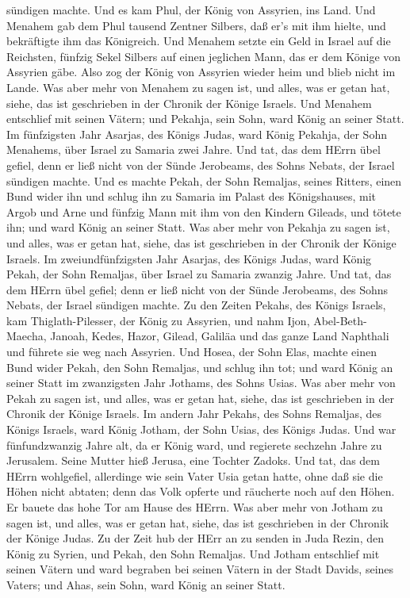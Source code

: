 sündigen machte.  Und es kam Phul, der König von Assyrien,
ins Land. Und Menahem gab dem Phul tausend Zentner Silbers, daß er's mit
ihm hielte, und bekräftigte ihm das Königreich.  Und
Menahem setzte ein Geld in Israel auf die Reichsten, fünfzig Sekel
Silbers auf einen jeglichen Mann, das er dem Könige von Assyrien gäbe.
Also zog der König von Assyrien wieder heim und blieb nicht im Lande.
 Was aber mehr von Menahem zu sagen ist, und alles, was er
getan hat, siehe, das ist geschrieben in der Chronik der Könige Israels.
 Und Menahem entschlief mit seinen Vätern; und Pekahja,
sein Sohn, ward König an seiner Statt.  Im fünfzigsten Jahr
Asarjas, des Königs Judas, ward König Pekahja, der Sohn Menahems, über
Israel zu Samaria zwei Jahre.  Und tat, das dem HErrn übel
gefiel, denn er ließ nicht von der Sünde Jerobeams, des Sohns Nebats,
der Israel sündigen machte.  Und es machte Pekah, der Sohn
Remaljas, seines Ritters, einen Bund wider ihn und schlug ihn zu Samaria
im Palast des Königshauses, mit Argob und Arne und fünfzig Mann mit ihm
von den Kindern Gileads, und tötete ihn; und ward König an seiner Statt.
 Was aber mehr von Pekahja zu sagen ist, und alles, was er
getan hat, siehe, das ist geschrieben in der Chronik der Könige Israels.
 Im zweiundfünfzigsten Jahr Asarjas, des Königs Judas, ward
König Pekah, der Sohn Remaljas, über Israel zu Samaria zwanzig Jahre.
 Und tat, das dem HErrn übel gefiel; denn er ließ nicht von
der Sünde Jerobeams, des Sohns Nebats, der Israel sündigen machte.
 Zu den Zeiten Pekahs, des Königs Israels, kam
Thiglath-Pilesser, der König zu Assyrien, und nahm Ijon,
Abel-Beth-Maecha, Janoah, Kedes, Hazor, Gilead, Galiläa und das ganze
Land Naphthali und führete sie weg nach Assyrien.  Und
Hosea, der Sohn Elas, machte einen Bund wider Pekah, den Sohn Remaljas,
und schlug ihn tot; und ward König an seiner Statt im zwanzigsten Jahr
Jothams, des Sohns Usias.  Was aber mehr von Pekah zu sagen
ist, und alles, was er getan hat, siehe, das ist geschrieben in der
Chronik der Könige Israels.  Im andern Jahr Pekahs, des
Sohns Remaljas, des Königs Israels, ward König Jotham, der Sohn Usias,
des Königs Judas.  Und war fünfundzwanzig Jahre alt, da er
König ward, und regierete sechzehn Jahre zu Jerusalem. Seine Mutter hieß
Jerusa, eine Tochter Zadoks.  Und tat, das dem HErrn
wohlgefiel, allerdinge wie sein Vater Usia getan hatte, 
ohne daß sie die Höhen nicht abtaten; denn das Volk opferte und
räucherte noch auf den Höhen. Er bauete das hohe Tor am Hause des HErrn.
 Was aber mehr von Jotham zu sagen ist, und alles, was er
getan hat, siehe, das ist geschrieben in der Chronik der Könige Judas.
 Zu der Zeit hub der HErr an zu senden in Juda Rezin, den
König zu Syrien, und Pekah, den Sohn Remaljas.  Und Jotham
entschlief mit seinen Vätern und ward begraben bei seinen Vätern in der
Stadt Davids, seines Vaters; und Ahas, sein Sohn, ward König an seiner
Statt.

